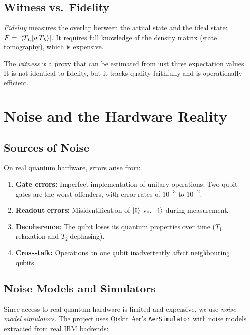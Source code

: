 \documentclass[11pt,a4paper,twoside]{report}
\theoremstyle{definition}
\newcommand{\code}[1]{\texttt{#1}}
\begin{document}
\section{Witness vs.\ Fidelity}

\emph{Fidelity} measures the overlap between the actual state and the
ideal state: $F = |\!\braket{T_L|\rho|T_L}\!|$. It requires full
knowledge of the density matrix (state tomography), which is expensive.

The \emph{witness} is a proxy that can be estimated from just three
expectation values. It is not identical to fidelity, but it tracks
quality faithfully and is operationally efficient.

\chapter{Noise and the Hardware Reality}
\label{ch:noise}

\section{Sources of Noise}

On real quantum hardware, errors arise from:

\begin{enumerate}
  \item \textbf{Gate errors:} Imperfect implementation of unitary
        operations. Two-qubit gates are the worst offenders, with error
        rates of $10^{-3}$ to $10^{-2}$.
  \item \textbf{Readout errors:} Misidentification of $\ket{0}$ vs.\
        $\ket{1}$ during measurement.
  \item \textbf{Decoherence:} The qubit loses its quantum properties
        over time ($T_1$ relaxation and $T_2$ dephasing).
  \item \textbf{Cross-talk:} Operations on one qubit inadvertently
        affect neighbouring qubits.
\end{enumerate}

\section{Noise Models and Simulators}

Since access to real quantum hardware is limited and expensive, we use
\emph{noise-model simulators}. The project uses Qiskit Aer's
\code{AerSimulator} with noise models extracted from real IBM backends:
\end{document}
